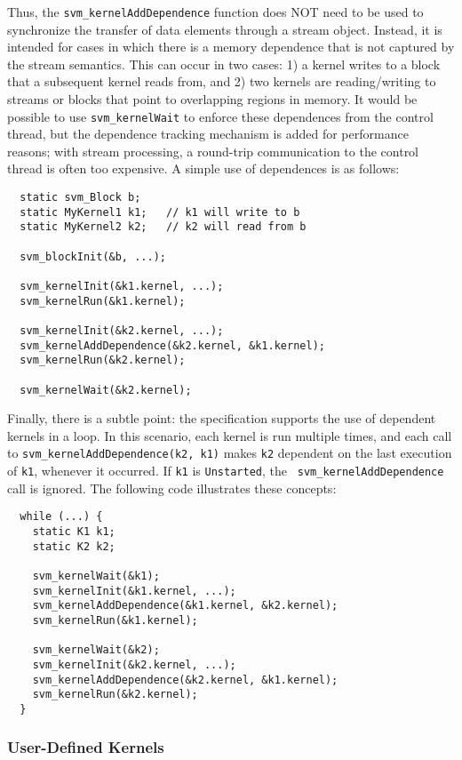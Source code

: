 Thus, the {\tt svm\_kernelAddDependence} function does NOT need to be
used to synchronize the transfer of data elements through a stream
object.  Instead, it is intended for cases in which there is a memory
dependence that is not captured by the stream semantics.  This can
occur in two cases: 1) a kernel writes to a block that a subsequent
kernel reads from, and 2) two kernels are reading/writing to streams
or blocks that point to overlapping regions in memory.  It would be
possible to use {\tt svm\_kernelWait} to enforce these dependences
from the control thread, but the dependence tracking mechanism is
added for performance reasons; with stream processing, a round-trip
communication to the control thread is often too expensive.  A simple
use of dependences is as follows:

{\small
\begin{verbatim}
  static svm_Block b;
  static MyKernel1 k1;   // k1 will write to b
  static MyKernel2 k2;   // k2 will read from b

  svm_blockInit(&b, ...);

  svm_kernelInit(&k1.kernel, ...);  
  svm_kernelRun(&k1.kernel);

  svm_kernelInit(&k2.kernel, ...);
  svm_kernelAddDependence(&k2.kernel, &k1.kernel);
  svm_kernelRun(&k2.kernel);

  svm_kernelWait(&k2.kernel);
\end{verbatim}}

Finally, there is a subtle point: the specification supports the use
of dependent kernels in a loop.  In this scenario, each kernel is run
multiple times, and each call to {\tt svm\_kernelAddDependence(k2,
k1)} makes {\tt k2} dependent on the last execution of {\tt k1},
whenever it occurred. If {\tt k1} is {\tt Unstarted}, the {\tt
svm\_kernelAddDependence} call is ignored. The following code
illustrates these concepts:

{\small
\begin{verbatim}
  while (...) {
    static K1 k1;
    static K2 k2;

    svm_kernelWait(&k1);
    svm_kernelInit(&k1.kernel, ...);
    svm_kernelAddDependence(&k1.kernel, &k2.kernel);
    svm_kernelRun(&k1.kernel);

    svm_kernelWait(&k2);
    svm_kernelInit(&k2.kernel, ...);
    svm_kernelAddDependence(&k2.kernel, &k1.kernel);
    svm_kernelRun(&k2.kernel);
  }
\end{verbatim}}

\subsubsection{User-Defined Kernels}
\label{sec:kernelhlc}

